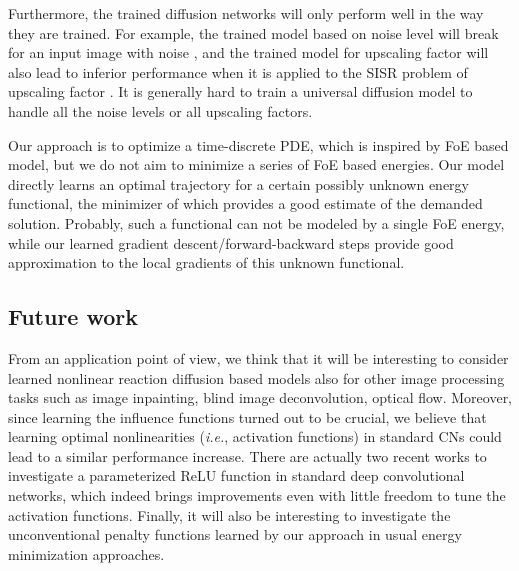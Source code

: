 \documentclass[10pt,journal,compsoc]{IEEEtran}
\newcommand{\ie}{\emph{i.e.}}
\begin{document}
Furthermore, the trained diffusion networks will only perform well in the way they are trained. For example, the trained model 
based on noise level  will break for an input image with noise , and the trained model for 
upscaling factor  will also lead to inferior performance when it is applied to the SISR problem of 
upscaling factor . It is generally hard to train a universal diffusion model to handle all the noise levels or 
all upscaling factors. 

Our approach is to optimize a time-discrete PDE, which is inspired by 
FoE based model, but we do not aim to minimize 
a series of FoE based energies. Our model directly learns an optimal trajectory 
for a certain possibly unknown energy functional, 
the minimizer of which provides a good estimate of the demanded solution. 
Probably, such a functional can not be modeled by a single FoE energy, 
while our learned gradient descent/forward-backward 
steps provide good approximation to the local gradients of this unknown functional.

\subsection{Future work} 
From an application point of view, we
think that it will be interesting to consider learned nonlinear reaction diffusion based models also 
for other image processing tasks
such as image inpainting, blind image deconvolution, optical
flow. Moreover, since learning the influence functions turned out to
be crucial, we believe that learning optimal nonlinearities (\ie, activation functions) in standard CNs
could lead to a similar performance increase. There are actually two recent works \cite{agostinelli2014learning, he2015delving} 
to investigate a parameterized ReLU function in standard deep convolutional networks, which indeed brings improvements even 
with little freedom to tune the activation functions. Finally, it will also be
interesting to investigate the unconventional penalty functions
learned by our approach in usual energy minimization approaches.


\begin{comment}
\ifCLASSOPTIONcompsoc
\section*{Acknowledgments}
\else
\section*{Acknowledgment}
\fi


The authors would like to thank...
\end{comment}
\end{document}
